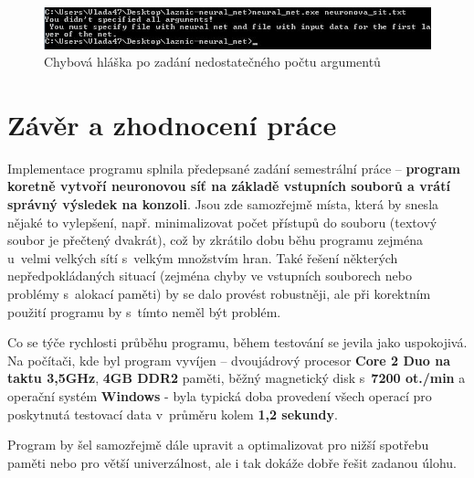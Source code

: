 \documentclass[11pt]{article}
\begin{document}
\begin{figure}[htbp]
\centering
\includegraphics[width = 15cm]{PCerror.jpg}
\begin{center}
\caption{Chybová hláška po zadání nedostatečného počtu argumentů}
\end{center}
\end{figure}

\newpage

\section{Závěr a zhodnocení práce}

Implementace programu splnila předepsané zadání semestrální práce – \textbf{program koretně vytvoří neuronovou síť na základě vstupních souborů a vrátí správný výsledek na konzoli}. Jsou zde samozřejmě místa, která by snesla nějaké to vylepšení, např. minimalizovat počet přístupů do souboru (textový soubor je přečtený dvakrát), což by zkrátilo dobu běhu programu zejména u~velmi velkých sítí s~velkým množstvím hran. Také řešení některých nepředpokládaných situací (zejména chyby ve vstupních souborech nebo problémy s~alokací paměti) by se dalo provést robustněji, ale při korektním použití programu by s~tímto neměl být problém.

Co se týče rychlosti průběhu programu, během testování se jevila jako uspokojivá. Na počítači, kde byl program vyvíjen – dvoujádrový procesor \textbf {Core 2 Duo na taktu 3,5GHz}, \textbf{4GB DDR2} paměti, běžný magnetický disk s~\textbf{7200 ot./min} a operační systém \textbf{Windows} -  byla typická doba provedení všech operací pro poskytnutá testovací data v~průměru kolem \textbf{1,2 sekundy}.

Program by šel samozřejmě dále upravit a optimalizovat pro nižší spotřebu paměti nebo pro větší univerzálnost, ale i tak dokáže dobře řešit zadanou úlohu.
\end{document}

